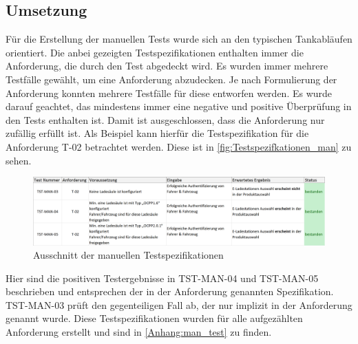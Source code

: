 \subsection{Umsetzung}
Für die Erstellung der manuellen Tests wurde sich an den typischen Tankabläufen orientiert. Die anbei gezeigten Testspezifikationen enthalten immer die Anforderung, die durch den Test abgedeckt wird. Es wurden immer mehrere Testfälle gewählt, um eine Anforderung abzudecken. Je nach Formulierung der Anforderung konnten mehrere Testfälle für diese entworfen werden. Es wurde darauf geachtet, das mindestens immer eine negative und positive Überprüfung in den Tests enthalten ist. Damit ist ausgeschlossen, dass die Anforderung nur zufällig erfüllt ist. Als Beispiel kann hierfür die Testspezifikation für die Anforderung T-02 betrachtet werden. Diese ist in \autoref{fig:Testspezifkationen_man} zu sehen.\newline
\begin{figure}[H]
	\centering
	\includegraphics[width=1.0\textwidth]{images/Test/Ausschnitt_manuelle_TestSpezifikationen.png}
	\caption{Ausschnitt der manuellen Testspezifikationen \cite{Eigene_Darstellung}}
	\label{fig:Testspezifkationen_man}
\end{figure}
\noindent Hier sind die positiven Testergebnisse in TST-MAN-04 und TST-MAN-05 beschrieben und entsprechen der in der Anforderung genannten Spezifikation. TST-MAN-03 prüft den gegenteiligen Fall ab, der nur implizit in der Anforderung genannt wurde. Diese Testspezifikationen wurden für alle aufgezählten Anforderung erstellt und sind in \autoref{Anhang:man_test} zu finden.

